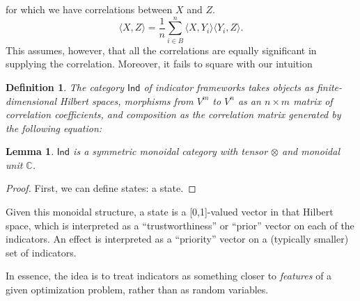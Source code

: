 \documentclass{sig-alternate-05-2015}
\theoremstyle{plain}
\newtheorem{lem}[thm]{Lemma}
\theoremstyle{plain}
\newtheorem{define}{Definition}
\theoremstyle{remark}
\newcommand{\Cat}[1]{\mathsf{#1}}
\def\Ind{\Cat{Ind}}
\begin{document}
 for which we have correlations between $X$ and $Z$.
\[ \langle X , Z \rangle = \frac{1}{n} \sum_{i \in B}^n \langle X,Y_i \rangle \langle Y_i, Z \rangle.\] 
This assumes, however, that all the correlations are equally significant in supplying the correlation. Moreover, it fails to square with our intuition

\begin{define}The category $\Ind$ of indicator frameworks takes objects as finite-dimensional Hilbert spaces, morphisms from $V^m$ to $V^n$ as an $n \times m$ matrix of correlation coefficients, and composition as the correlation matrix generated by the following equation: 

\end{define}

\begin{lem}$\Ind$ is a symmetric monoidal category with tensor $\otimes$ and monoidal unit $\mathbb{C}$.
\end{lem}

\begin{proof}
First, we can define states: a state.
\end{proof}

Given this monoidal structure, a state is a [0,1]-valued vector in that Hilbert space, which is interpreted as a ``trustworthiness'' or ``prior'' vector on each of the indicators. An effect is interpreted as a ``priority'' vector on a (typically smaller) set of indicators.

In essence, the idea is to treat indicators as something closer to \emph{features} of a given optimization problem, rather than as random variables.




\end{document}
